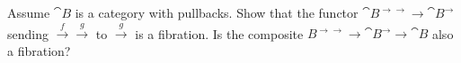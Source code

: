 \begin{exercise}
Assume \(\cat{B}\) is a category with pullbacks.
Show that the functor \(\cat{B}^{\rightarrow\rightarrow} \to \cat{B}^\rightarrow\) sending \(\overset{f}{\to}\overset{g}{\to}\) to \(\overset{g}{\to}\) is a fibration.
Is the composite \(B^{\rightarrow\rightarrow} \to \cat{B}^{\rightarrow} \to \cat{B}\) also a fibration?
\end{exercise}